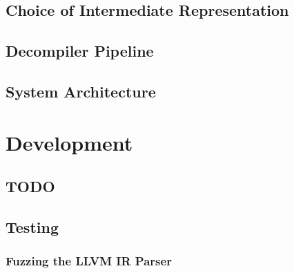 \documentclass[12pt, a4paper]{article}
\begin{document}



\subsection{Choice of Intermediate Representation}


\subsection{Decompiler Pipeline}


\subsection{System Architecture}



\section{Development}


\subsection{TODO}


\subsection{Testing}


\subsubsection{Fuzzing the LLVM IR Parser}
\end{document}
